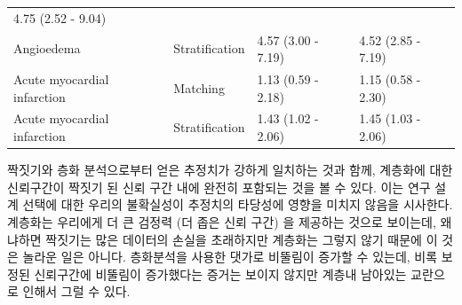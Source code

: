 \documentclass[10.5pt]{book}
\theoremstyle{definition}
\theoremstyle{definition}
\theoremstyle{definition}
\theoremstyle{remark}
\begin{document}
\begin{longtable}[]{@{}llll@{}}
\begin{minipage}[t]{0.17\columnwidth}
4.75 (2.52 - 9.04)\strut
\end{minipage}\tabularnewline
\begin{minipage}[t]{0.27\columnwidth}\raggedright\strut
Angioedema\strut
\end{minipage} & \begin{minipage}[t]{0.15\columnwidth}\raggedright\strut
Stratification\strut
\end{minipage} & \begin{minipage}[t]{0.17\columnwidth}\raggedright\strut
4.57 (3.00 - 7.19)\strut
\end{minipage} & \begin{minipage}[t]{0.17\columnwidth}\raggedright\strut
4.52 (2.85 - 7.19)\strut
\end{minipage}\tabularnewline
\begin{minipage}[t]{0.27\columnwidth}\raggedright\strut
Acute myocardial infarction\strut
\end{minipage} & \begin{minipage}[t]{0.15\columnwidth}\raggedright\strut
Matching\strut
\end{minipage} & \begin{minipage}[t]{0.17\columnwidth}\raggedright\strut
1.13 (0.59 - 2.18)\strut
\end{minipage} & \begin{minipage}[t]{0.17\columnwidth}\raggedright\strut
1.15 (0.58 - 2.30)\strut
\end{minipage}\tabularnewline
\begin{minipage}[t]{0.27\columnwidth}\raggedright\strut
Acute myocardial infarction\strut
\end{minipage} & \begin{minipage}[t]{0.15\columnwidth}\raggedright\strut
Stratification\strut
\end{minipage} & \begin{minipage}[t]{0.17\columnwidth}\raggedright\strut
1.43 (1.02 - 2.06)\strut
\end{minipage} & \begin{minipage}[t]{0.17\columnwidth}\raggedright\strut
1.45 (1.03 - 2.06)\strut
\end{minipage}\tabularnewline
\bottomrule
\end{longtable}

짝짓기와 층화 분석으로부터 얻은 추정치가 강하게 일치하는 것과 함께,
계층화에 대한 신뢰구간이 짝짓기 된 신뢰 구간 내에 완전히 포함되는 것을
볼 수 있다. 이는 연구 설계 선택에 대한 우리의 불확실성이 추정치의
타당성에 영향을 미치지 않음을 시사한다. 계층화는 우리에게 더 큰 검정력
(더 좁은 신뢰 구간) 을 제공하는 것으로 보이는데, 왜냐하면 짝짓기는 많은
데이터의 손실을 초래하지만 계층화는 그렇지 않기 때문에 이 것은 놀라운
일은 아니다. 층화분석을 사용한 댓가로 비뚤림이 증가할 수 있는데, 비록
보정된 신뢰구간에 비뚤림이 증가했다는 증거는 보이지 않지만 계층내
남아있는 교란으로 인해서 그럴 수 있다.
\end{document}
